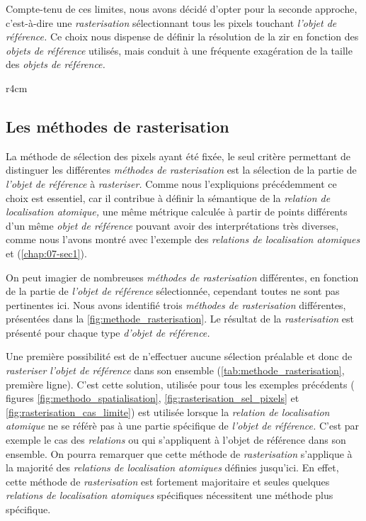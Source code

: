 Compte-tenu de ces limites, nous avons décidé d'opter pour la seconde
approche, c'est-à-dire une \emph{rasterisation} sélectionnant tous les
pixels touchant \emph{l'objet de référence.} Ce choix nous dispense de
définir la résolution de la \ac{zir} en fonction des \emph{objets de
  référence} utilisés, mais conduit à une fréquente exagération de la
taille des \emph{objets de référence.}

\begin{wrapfigure}{r}{4cm}
  \centering
  
  \caption{Illustration d'une situation où la \emph{rasterisation}
    aboutit à un raster vide}
  \label{fig:rasterisation_cas_limite}
\end{wrapfigure}

\subsection{Les méthodes de rasterisation}

La méthode de sélection des pixels ayant été fixée, le seul critère
permettant de distinguer les différentes \emph{méthodes de
  rasterisation} est la sélection de la partie de \emph{l'objet de
  référence} à \emph{rasteriser.} Comme nous l'expliquions
précédemment ce choix est essentiel, car il contribue à définir la
sémantique de la \emph{relation de localisation atomique,} une même
métrique calculée à partir de points différents d'un même \emph{objet
  de référence} pouvant avoir des interprétations très diverses, comme
nous l'avons montré avec l'exemple des \emph{relations de localisation
  atomiques}  et
 (\autoref{chap:07-sec1}).

On peut imagier de nombreuses \emph{méthodes de rasterisation}
différentes, en fonction de la partie de \emph{l'objet de référence}
sélectionnée, cependant toutes ne sont pas pertinentes ici. Nous avons
identifié trois \emph{méthodes de rasterisation} différentes,
présentées dans la \ref{fig:methode_rasterisation}. Le résultat de la
\emph{rasterisation} est présenté pour chaque type \emph{d'objet de
  référence.}

Une première possibilité est de n'effectuer aucune sélection préalable
et donc de \emph{rasteriser} \emph{l'objet de référence} dans son
ensemble (\autoref{tab:methode_rasterisation}, première ligne). C'est
cette solution, utilisée pour tous les exemples précédents (\ie
figures \ref{fig:methodo_spatialisation},
\ref{fig:rasterisation_sel_pixels} et
\ref{fig:rasterisation_cas_limite}) est utilisée lorsque la
\emph{relation de localisation atomique} ne se référè pas à une partie
spécifique de \emph{l'objet de référence.} C'est par exemple le cas
des \emph{relations}  ou 
qui s'appliquent à l'objet de référence dans son ensemble. On pourra
remarquer que cette méthode de \emph{rasterisation} s'applique à la
majorité des \emph{relations de localisation atomiques} définies
jusqu'ici. En effet, cette méthode de \emph{rasterisation} est
fortement majoritaire et seules quelques \emph{relations de
  localisation atomiques} spécifiques nécessitent une méthode plus
spécifique.

